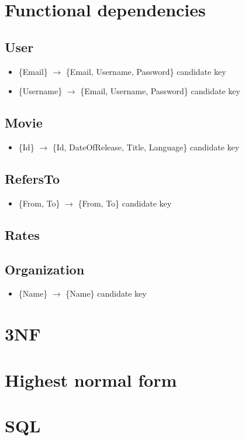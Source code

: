 \section{Functional dependencies}
{
\newcommand{\derives}[3]{\item{\{#1\} $\rightarrow$ \{#2\}} 
\ifthenelse{\equal{#3}{true}}
   	{candidate key}
   	{}
}
\subsection*{User}
\begin{itemize}
\item{\{Email\} $\rightarrow$ \{Email, Username, Password\}} candidate key
\item{\{Username\} $\rightarrow$ \{Email, Username, Password\} candidate key}
\end{itemize}

\subsection*{Movie}
\begin{itemize}
\item{\{Id\} $\rightarrow$ \{Id, DateOfRelease, Title, Language\} candidate key}
\end{itemize}

\subsection*{RefersTo}
\begin{itemize}
\item{\{From, To\} $\rightarrow$ \{From, To\} candidate key}
\end{itemize}

\subsection*{Rates}

\subsection*{Organization}
\begin{itemize}
\item{\{Name\} $\rightarrow$ \{Name\} candidate key}
\end{itemize}
}
\section{3NF}

\section{Highest normal form}

\section{SQL}
